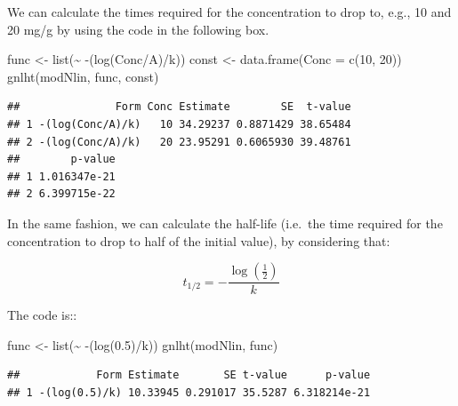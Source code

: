 \documentclass[a4paper,12pt,oneside]{book}
\newenvironment{Shaded}{\begin{snugshade}}{\end{snugshade}}
\newcommand{\DecValTok}[1]{#1}
\newcommand{\FloatTok}[1]{#1}
\newcommand{\SpecialCharTok}[1]{#1}
\newcommand{\OtherTok}[1]{#1}
\newcommand{\FunctionTok}[1]{#1}
\newcommand{\AttributeTok}[1]{#1}
\newcommand{\NormalTok}[1]{#1}
\begin{document}
We can calculate the times required for the concentration to drop to, e.g., 10 and 20 mg/g by using the code in the following box.

\vspace{12pt}

\begin{Shaded}
\begin{Highlighting}[]
\NormalTok{func }\OtherTok{\textless{}{-}} \FunctionTok{list}\NormalTok{(}\SpecialCharTok{\textasciitilde{}} \SpecialCharTok{{-}}\NormalTok{(}\FunctionTok{log}\NormalTok{(Conc}\SpecialCharTok{/}\NormalTok{A)}\SpecialCharTok{/}\NormalTok{k))}
\NormalTok{const }\OtherTok{\textless{}{-}} \FunctionTok{data.frame}\NormalTok{(}\AttributeTok{Conc =} \FunctionTok{c}\NormalTok{(}\DecValTok{10}\NormalTok{, }\DecValTok{20}\NormalTok{)) }
\FunctionTok{gnlht}\NormalTok{(modNlin, func,  const)}
\end{Highlighting}
\end{Shaded}

\begin{verbatim}
##               Form Conc Estimate        SE  t-value
## 1 -(log(Conc/A)/k)   10 34.29237 0.8871429 38.65484
## 2 -(log(Conc/A)/k)   20 23.95291 0.6065930 39.48761
##        p-value
## 1 1.016347e-21
## 2 6.399715e-22
\end{verbatim}

In the same fashion, we can calculate the half-life (i.e.~the time required for the concentration to drop to half of the initial value), by considering that:

\[t_{1/2} = - \frac{ \log \left( {\frac{1}{2}} \right) }{k}\]

The code is::

\vspace{12pt}

\begin{Shaded}
\begin{Highlighting}[]
\NormalTok{func }\OtherTok{\textless{}{-}} \FunctionTok{list}\NormalTok{(}\SpecialCharTok{\textasciitilde{}} \SpecialCharTok{{-}}\NormalTok{(}\FunctionTok{log}\NormalTok{(}\FloatTok{0.5}\NormalTok{)}\SpecialCharTok{/}\NormalTok{k))}
\FunctionTok{gnlht}\NormalTok{(modNlin, func)}
\end{Highlighting}
\end{Shaded}

\begin{verbatim}
##            Form Estimate       SE t-value      p-value
## 1 -(log(0.5)/k) 10.33945 0.291017 35.5287 6.318214e-21
\end{verbatim}
\end{document}
